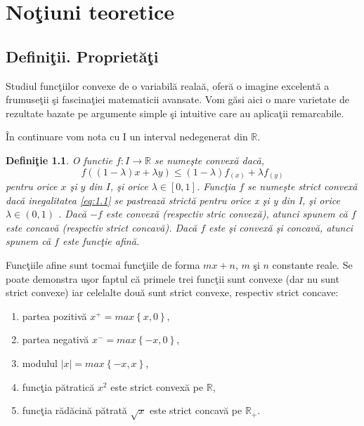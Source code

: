 \documentclass[a4paper,12pt,oneside]{report}
\newtheorem{definition}{Defini\c tie}
\begin{document}
%
%
%
%
\chapter{No\c{t}iuni teoretice}

\section{Defini\c{t}ii. Propriet\u{a}\c{t}i}

\nocite{niculescu}
\nocite{marasanu}

Studiul func\c{t}iilor convexe de o variabil\u {a} reala\u {a}, ofer\u{a} o imagine excelent\u {a} a frumuse\c {t}ii \c{s}i fascina\c{t}iei matematicii avansate. Vom g\u{a}si aici o mare varietate de rezultate bazate pe argumente simple \c{s}i intuitive care au aplica\c{t}ii remarcabile.

\^{I}n continuare vom nota cu I un interval nedegenerat din \(\mathbb{R}\).

\begin{definition}

O functie \(f: I \rightarrow \mathbb{R}\) se nume\c{s}te convex\u{a} dac\u{a},
\begin{displaymath}
f \left ( \left ( 1 - \lambda  \right )x + \lambda y \right )\leq \left ( 1 - \lambda  \right ) f_{\left ( x \right )} + \lambda f_{\left ( y \right )}   \label{eq:1.1} \tag{1.1}
\end{displaymath}
pentru orice \(x\) \c{s}i \(y\) din \(I\), \c{s}i orice \(\lambda \in \left [ 0,1 \right ]\). Func\c{t}ia \(f\) se nume\c{s}te strict convex\u{a} dac\u{a} inegalitatea \ref{eq:1.1} se pastreaz\u{a}  strict\u{a} pentru orice x \c{s}i y din I, \c{s}i orice  \(\lambda \in \left ( 0,1 \right )\) . Dac\u{a} \(-f\) este convex\u{a} (respectiv stric convex\u{a}), atunci spunem c\u{a} \(f\) este concav\u{a} (respectiv strict concav\u{a}). Dac\u{a} \(f\) este \c{s}i convex\u{a} \c{s}i concav\u{a}, atunci spunem c\u{a} \(f\) este func\c{t}ie afin\u{a}.
\end{definition}

Func\c{t}iile afine sunt tocmai func\c{t}iile de forma \(mx + n\),  \(m\) \c{s}i \(n\) constante reale.
Se poate demonstra u\c{s}or faptul c\u{a} primele trei func\c{t}ii sunt convexe (dar nu sunt strict convexe) iar celelalte dou\u{a} sunt strict convexe, respectiv strict concave:
\begin{enumerate}
  \item partea pozitiv\u{a} \(x^{+} = max \left \{ x,0 \right \}\),
  \item partea negativ\u{a} \(x^{-} = max \left \{ -x,0 \right \}\),
  \item modulul \(\left | x \right | = max \left \{ -x,x \right \}\),
  \item func\c{t}ia p\u{a}tratic\u{a} \(x^{2}\)  este strict convex\u{a} pe \(\mathbb{R}\),
  \item func\c{t}ia r\u{a}d\u{a}cin\u{a} p\u{a}trat\u{a} \(\sqrt{x}\) este strict concav\u{a} pe \(\mathbb{R}_{+}\).
\end{enumerate}
\end{document}
